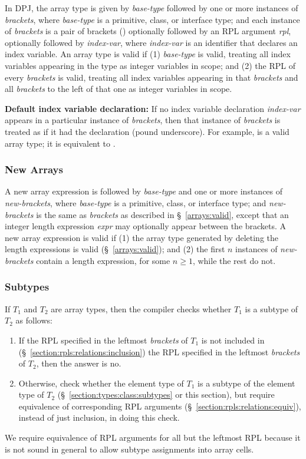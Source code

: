 In DPJ, the array type is given by \emph{base-type} followed by one or
more instances of \emph{brackets}, where \emph{base-type} is a
primitive, class, or interface type; and each instance of
\emph{brackets} is a pair of brackets (\kwd{[]}) optionally followed
by an RPL argument \kwd{<}\emph{rpl}\kwd{>}, optionally followed by
\kwd{\#}\emph{index-var}, where \emph{index-var} is an identifier that
declares an index variable.  An array type is valid if (1)
\emph{base-type} is valid, treating all index variables appearing in
the type as integer variables in scope; and (2) the RPL of every
\emph{brackets} is valid, treating all index variables appearing in
that \emph{brackets} and all \emph{brackets} to the left of that one
as integer variables in scope.

\noindent
\textbf{Default index variable declaration:} If no index variable
declaration \kwd{\#}\emph{index-var} appears in a particular instance
of \emph{brackets}, then that instance of \emph{brackets} is treated
as if it had the declaration \kwd{\#\_} (pound underscore).  For
example,  is a valid array type; it is equivalent to
.

\subsubsection{New Arrays}
\label{arrays:new}

A new array expression is  followed by \emph{base-type} and
one or more instances of \emph{new-brackets}, where \emph{base-type}
is a primitive, class, or interface type; and \emph{new-brackets} is
the same as \emph{brackets} as described in
\S~\ref{arrays:valid}, except that an integer length expression
\emph{expr} may optionally appear between the brackets.  A new array
expression is valid if (1) the array type generated by deleting the
length expressions is valid (\S~\ref{arrays:valid}); and (2) the
first $n$ instances of \emph{new-brackets} contain a length
expression, for some $n \geq 1$, while the rest do not.

\subsubsection{Subtypes}

If $T_1$ and $T_2$ are array types, then the compiler
checks whether $T_1$ is a subtype of $T_2$ as follows:
\begin{enumerate}
\item If the RPL specified in the leftmost \emph{brackets} of
  $T_1$ is not included in
  (\S~\ref{section:rpls:relations:inclusion}) the RPL specified in the
  leftmost \emph{brackets} of $T_2$, then the answer is no.
\item Otherwise, check whether the element type of $T_1$ is a subtype
  of the element type of $T_2$ (\S~\ref{section:types:class:subtypes}
  or this section), but require equivalence of corresponding RPL
  arguments (\S~\ref{section:rpls:relations:equiv}), instead of just
  inclusion, in doing this check.
\end{enumerate}
We require equivalence of RPL arguments for all but the leftmost RPL
because it is not sound in general to allow subtype assignments into
array cells.

